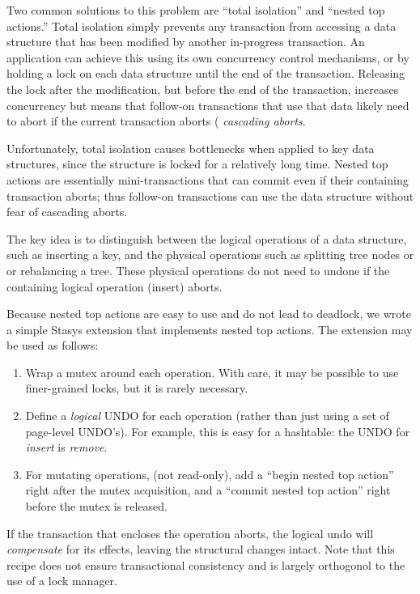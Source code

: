 \documentclass[letterpaper,twocolumn,10pt]{article}
\newcommand{\yad}{Stasys\xspace}
\begin{document}
Two common solutions to this problem are ``total isolation'' and
``nested top actions.''  Total isolation simply prevents any
transaction from accessing a data structure that has been modified by
another in-progress transaction.  An application can achieve this
using its own concurrency control mechanisms, or by holding a lock on
each data structure until the end of the transaction.  Releasing the
lock after the modification, but before the end of the transaction,
increases concurrency but means that follow-on transactions that use
that data likely need to abort if the current transaction aborts ({\em
cascading aborts}.

Unfortunately, total isolation causes bottlenecks when applied to key
data structures, since the structure is locked for a relatively long
time.  Nested top actions are essentially mini-transactions that can
commit even if their containing transaction aborts; thus follow-on
transactions can use the data structure without fear of cascading
aborts.  

The key idea is to distinguish between the logical operations of a
data structure, such as inserting a key, and the physical operations
such as splitting tree nodes or or rebalancing a tree. These physical
operations do not need to undone if the containing logical operation
(insert) aborts.

Because nested top actions are easy to use and do not lead to 
deadlock, we wrote a simple \yad extension that
implements nested top actions.  The extension may be used as follows:

\begin{enumerate}
\item Wrap a mutex around each operation.  With care, it may be possible to use finer-grained locks, but it is rarely necessary.
\item Define a {\em logical} UNDO for each operation (rather than just using
  a set of page-level UNDO's).  For example, this is easy for a
  hashtable: the UNDO for {\em insert} is {\em remove}.
\item For mutating operations, (not read-only), add a ``begin nested
  top action'' right after the mutex acquisition, and a ``commit
  nested top action'' right before the mutex is released.
\end{enumerate}

If the transaction that encloses the operation aborts, the logical
undo will {\em compensate} for its effects, leaving the structural
changes intact.  Note that this recipe does not ensure transactional
consistency and is largely orthogonol to the use of a lock manager.
\end{document}
